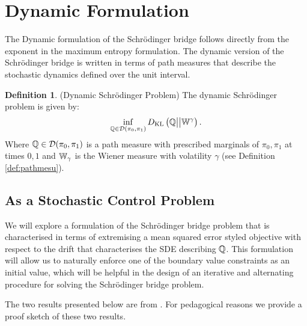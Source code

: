 \documentclass[a4paper,12pt,twoside,openright]{report}
\theoremstyle{definition}
\newtheorem{definition}{Definition}[section]
\begin{document}
\section{Dynamic Formulation}
The Dynamic formulation of the Schrödinger bridge follows directly from the exponent in the maximum entropy formulation.  The dynamic version of the Schrödinger bridge is written in terms of path measures that describe the stochastic dynamics defined over the unit interval.
\begin{definition}
    (Dynamic Schrödinger Problem) The dynamic Schrödinger problem is given by:
    \begin{align}
        \inf_{{\mathbb{Q}} \in {\mathcal{D}}(\pi_0, \pi_1)} D_{\mathrm{KL}}\left({\mathbb{Q}} \big|\big| \mathbb{W}^{\gamma}\right).
    \end{align}
    Where ${\mathbb{Q}} \in {\mathcal{D}}(\pi_0, \pi_1)$ is a path measure with prescribed marginals of $\pi_0, \pi_1$ at times $0, 1$ and $\mathbb{W}_{\gamma}$ is the Wiener measure with volatility $\gamma$ (see Definition \ref{def:pathmesu}). 
\end{definition}
\subsection{As a Stochastic Control Problem}

We will explore a formulation of the Schrödinger bridge problem that is characterised in terms of extremising a mean squared error styled objective with respect to the drift that characterises the SDE describing ${\mathbb{Q}}$. This formulation will allow us to naturally enforce one of the boundary value constraints as an initial value, which will be helpful in the design of an iterative and alternating procedure for solving the Schrödinger bridge problem.

The two results presented below are from \cite{pavon1991free}. For pedagogical reasons we provide a proof sketch of these two results.
\end{document}
